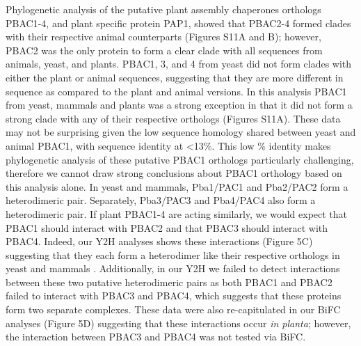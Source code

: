 Phylogenetic analysis of the putative plant assembly chaperones orthologs PBAC1-4, and plant specific protein PAP1, showed that PBAC2-4 formed clades with their respective animal counterparts (Figures S11A and B); however, PBAC2 was the only protein to form a clear clade with all sequences from animals, yeast, and plants. PBAC1, 3, and 4 from yeast did not form clades with either the plant or animal sequences, suggesting that they are more different in sequence as compared to the plant and animal versions. In this analysis PBAC1 from yeast, mammals and plants was a strong exception in that it did not form a strong clade with any of their respective orthologs (Figures S11A). These data may not be surprising given the low sequence homology shared between yeast and animal PBAC1, with sequence identity at <13\%. This low \% identity makes phylogenetic analysis of these putative PBAC1 orthologs particularly challenging, therefore we cannot draw strong conclusions about PBAC1 orthology based on this analysis alone. 
In yeast and mammals, Pba1/PAC1 and Pba2/PAC2 form a heterodimeric pair. Separately, Pba3/PAC3 and Pba4/PAC4 also form a heterodimeric pair. If plant PBAC1-4 are acting similarly, we would expect that PBAC1 should interact with PBAC2 and that PBAC3 should interact with PBAC4.  Indeed, our Y2H analyses shows these interactions (Figure 5C) suggesting that they each form a heterodimer like their respective orthologs in yeast and mammals \citep{kunjappu14}. Additionally, in our Y2H we failed to detect interactions between these two putative heterodimeric pairs as both PBAC1 and PBAC2 failed to interact with PBAC3 and PBAC4, which suggests that these proteins form two separate complexes. These data were also re-capitulated in our BiFC analyses (Figure 5D) suggesting that these interactions occur \textit{in planta}; however, the interaction between PBAC3 and PBAC4 was not tested via BiFC.
